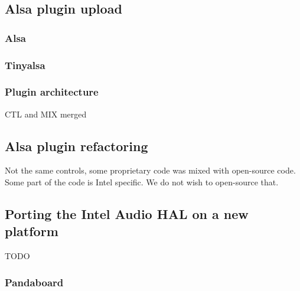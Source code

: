 \subsection{Alsa plugin upload}
\subsubsection{Alsa}
\subsubsection{Tinyalsa}
\subsubsection{Plugin architecture}
CTL and MIX merged

\subsection{Alsa plugin refactoring}
Not the same controls, some proprietary code was mixed with open-source code.
Some part of the code is Intel specific. We do not wish to open-source that.

\subsection{Porting the Intel Audio HAL on a new platform}
TODO
\subsubsection{Pandaboard}

